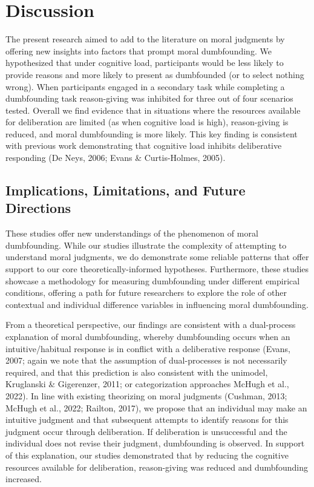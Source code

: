 \documentclass[
  man,floatsintext]{apa6}
\begin{document}
\newpage

\hypertarget{discussion}{%
\section{Discussion}\label{discussion}}

The present research aimed to add to the literature on moral judgments by offering new insights into factors that prompt moral dumbfounding. We hypothesized that under cognitive load, participants would be less likely to provide reasons and more likely to present as dumbfounded (or to select nothing wrong). When participants engaged in a secondary task while completing a dumbfounding task reason-giving was inhibited for three out of four scenarios tested. Overall we find evidence that in situations where the resources available for deliberation are limited (as when cognitive load is high), reason-giving is reduced, and moral dumbfounding is more likely. This key finding is consistent with previous work demonstrating that cognitive load inhibits deliberative responding (De Neys, 2006; Evans \& Curtis-Holmes, 2005).

\hypertarget{implications-limitations-and-future-directions}{%
\subsection{Implications, Limitations, and Future Directions}\label{implications-limitations-and-future-directions}}

These studies offer new understandings of the phenomenon of moral dumbfounding. While our studies illustrate the complexity of attempting to understand moral judgments, we do demonstrate some reliable patterns that offer support to our core theoretically-informed hypotheses. Furthermore, these studies showcase a methodology for measuring dumbfounding under different empirical conditions, offering a path for future researchers to explore the role of other contextual and individual difference variables in influencing moral dumbfounding.

From a theoretical perspective, our findings are consistent with a dual-process explanation of moral dumbfounding, whereby dumbfounding occurs when an intuitive/habitual response is in conflict with a deliberative response (Evans, 2007; again we note that the assumption of dual-processes is not necessarily required, and that this prediction is also consistent with the unimodel, Kruglanski \& Gigerenzer, 2011; or categorization approaches McHugh et al., 2022). In line with existing theorizing on moral judgments (Cushman, 2013; McHugh et al., 2022; Railton, 2017), we propose that an individual may make an intuitive judgment and that subsequent attempts to identify reasons for this judgment occur through deliberation. If deliberation is unsuccessful and the individual does not revise their judgment, dumbfounding is observed. In support of this explanation, our studies demonstrated that by reducing the cognitive resources available for deliberation, reason-giving was reduced and dumbfounding increased.
\end{document}
